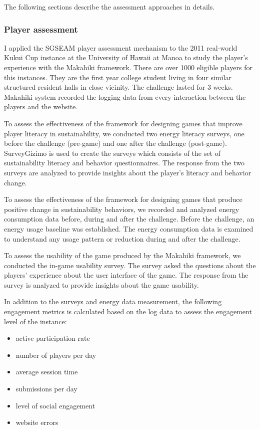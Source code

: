 The following sections describe the assessment approaches in details. 

\subsubsection{Player assessment}

I applied the SGSEAM player assessment mechanism to the 2011 real-world Kukui Cup instance at the University of Hawaii at Manoa to study the player's experience with the Makahiki framework. There are over 1000 eligible players for this instances. They are the first year college student living in four similar structured resident halls in close vicinity. The challenge lasted for 3 weeks. Makahiki system recorded the logging data from every interaction between the players and the website.

To assess the effectiveness of the framework for designing games that improve player literacy in sustainability, we
conducted two energy literacy surveys, one before the challenge (pre-game) and one after
the challenge (post-game). SurveyGizimo is used to create the surveys which consists of the set of sustainability literacy and behavior questionnaires. The response from the two surveys are analyzed to provide insights about the player's literacy and behavior change.

To assess the effectiveness of the framework for designing games that produce positive change in sustainability
behaviors, we recorded and analyzed energy consumption data before, during and after the
challenge.  Before the challenge, an energy usage baseline was established. The energy consumption data is examined to understand any usage pattern or reduction during and after the challenge.

To assess the usability of the game produced by the Makahiki framework, we conducted the in-game usability survey. The survey asked the questions about the players' experience about the user interface of the game. The response from the survey is analyzed to provide insights about the game usability.

In addition to the surveys and energy data measurement, the following engagement metrics is calculated based on the log data to assess the engagement level of the instance:

\begin{itemize}
\item active participation rate
\item number of players per day
\item average session time
\item submissions per day
\item level of social engagement
\item website errors
\end{itemize}

